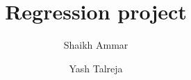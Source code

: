 \documentclass[a4paper,12pt,twoside]{article}
\title{Regression project}
\author{Shaikh Ammar \and Yash Talreja} \date{}
\begin{document}
\maketitle
\tableofcontents
\flushbottom











\end{document}
